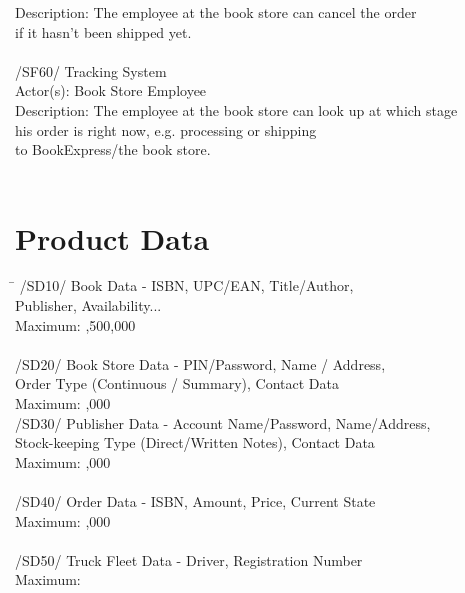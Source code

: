 \documentclass[11pt,a4paper,oneside,svgnames]{report}
\begin{document}
\begin{tabbing}
	 Description: \> The employee at the book store can cancel the order \\
	 \> if it hasn't been shipped yet. \\
	 \\
	 /SF60/ \> Tracking System \\
	 Actor(s): \> Book Store Employee \\
	 Description: \> The employee at the book store can look up at which stage \\
	 \> his order is right now, e.g. processing or shipping \\
	 \> to BookExpress/the book store.\\
	 \\
\end{tabbing} 
\clearpage
\section{Product Data}
\begin{tabbing}
\hspace{3cm}\=\kill
	/SD10/ \>  Book Data - ISBN, UPC/EAN, Title/Author, \\
	\> Publisher, Availability... \\
	Maximum: ,500,000 \\
	\\
	/SD20/ \> Book Store Data - PIN/Password, Name / Address,\\
	 \> Order Type (Continuous / Summary), Contact Data\\
	Maximum: ,000
	\\
	/SD30/ \> Publisher Data - Account Name/Password, Name/Address, \\
	\> Stock-keeping Type (Direct/Written Notes), Contact Data\\
	Maximum: ,000\\
	\\
	/SD40/ \> Order Data - ISBN, Amount, Price, Current State\\
	Maximum: ,000\\
	\\
	/SD50/ \> Truck Fleet Data - Driver, Registration Number\\
	Maximum: \\
	\\
\end{tabbing} 
\end{document}
